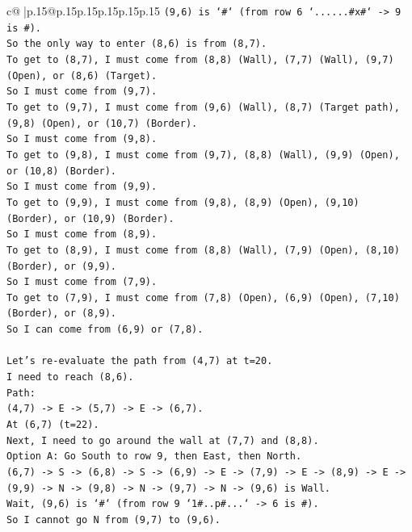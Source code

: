 \documentclass{article}
\begin{document}
{\begin{supertabular}{c@{$\;$}|p{.15\linewidth}@{}p{.15\linewidth}p{.15\linewidth}p{.15\linewidth}p{.15\linewidth}p{.15\linewidth}}
{{{\texttt{(9,6) is `\#` (from row 6 `......\#x\#` {-}> 9 is \#).} \\
\texttt{So the only way to enter (8,6) is from (8,7).} \\
\texttt{To get to (8,7), I must come from (8,8) (Wall), (7,7) (Wall), (9,7) (Open), or (8,6) (Target).} \\
\texttt{So I must come from (9,7).} \\
\texttt{To get to (9,7), I must come from (9,6) (Wall), (8,7) (Target path), (9,8) (Open), or (10,7) (Border).} \\
\texttt{So I must come from (9,8).} \\
\texttt{To get to (9,8), I must come from (9,7), (8,8) (Wall), (9,9) (Open), or (10,8) (Border).} \\
\texttt{So I must come from (9,9).} \\
\texttt{To get to (9,9), I must come from (9,8), (8,9) (Open), (9,10) (Border), or (10,9) (Border).} \\
\texttt{So I must come from (8,9).} \\
\texttt{To get to (8,9), I must come from (8,8) (Wall), (7,9) (Open), (8,10) (Border), or (9,9).} \\
\texttt{So I must come from (7,9).} \\
\texttt{To get to (7,9), I must come from (7,8) (Open), (6,9) (Open), (7,10) (Border), or (8,9).} \\
\texttt{So I can come from (6,9) or (7,8).} \\
\\ 
\texttt{Let's re{-}evaluate the path from (4,7) at t=20.} \\
\texttt{I need to reach (8,6).} \\
\texttt{Path:} \\
\texttt{(4,7) {-}> E {-}> (5,7) {-}> E {-}> (6,7).} \\
\texttt{At (6,7) (t=22).} \\
\texttt{Next, I need to go around the wall at (7,7) and (8,8).} \\
\texttt{Option A: Go South to row 9, then East, then North.} \\
\texttt{(6,7) {-}> S {-}> (6,8) {-}> S {-}> (6,9) {-}> E {-}> (7,9) {-}> E {-}> (8,9) {-}> E {-}> (9,9) {-}> N {-}> (9,8) {-}> N {-}> (9,7) {-}> N {-}> (9,6) is Wall.} \\
\texttt{Wait, (9,6) is `\#` (from row 9 `1\#..p\#...` {-}> 6 is \#).} \\
\texttt{So I cannot go N from (9,7) to (9,6).} \\
}}}
\end{supertabular}}
\end{document}
